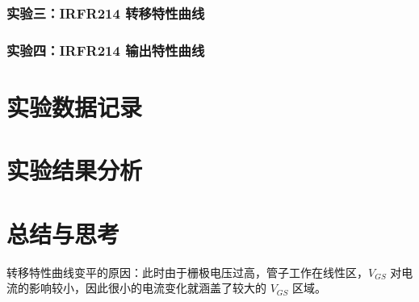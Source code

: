 \documentclass[lang=cn,11pt,a4paper,cite=authoryear]{elegantpaper}
\begin{document}

\subsubsection{实验三：IRFR214 转移特性曲线}

\subsubsection{实验四：IRFR214 输出特性曲线}

\section{实验数据记录}

\section{实验结果分析}

\section{总结与思考}

转移特性曲线变平的原因：此时由于栅极电压过高，管子工作在线性区，\(V_{GS}\) 对电流的影响较小，因此很小的电流变化就涵盖了较大的 \(V_{GS}\) 区域。




\end{document}
